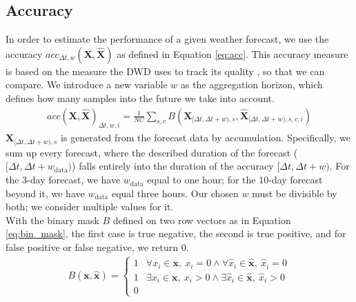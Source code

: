 \documentclass{article}
\theoremstyle{plain}
\theoremstyle{definition}
\theoremstyle{remark}
\begin{document}

\subsection{Accuracy}

In order to estimate the performance of a given weather forecast, we use the
accuracy $acc_{\Delta t, w}(\mathbf{X}, \hat{\mathbf{X}})$ as defined in
Equation \ref{eq:acc}.
This accuracy measure is based on the measure the DWD uses to track its quality
\cite{Forecast_quaility_DWD}, so that we can compare.
We introduce a new variable $w$ as the aggregation horizon, which defines how
many samples into the future we take into account.
\begin{align}
    acc(\mathbf{X}, \hat{\mathbf{X}})_{\Delta t, w, i} = \frac{1}{NC} \sum_{s,
        c} B(\mathbf{X}_{[\Delta t, \Delta t + w), s}, \hat{\mathbf{X}}_{[\Delta t,
    \Delta t + w), s, c, i})
    \label{eq:acc}
\end{align}
$\mathbf{X}_{[\Delta t, \Delta t + w), s}$ is generated from the forecast data
by accumulation.
Specifically, we sum up every forecast, where the described duration of the
forecast ($[\Delta t, \Delta t + w_\text{data})$) falls entirely into the
duration of the accuracy $[\Delta t, \Delta t + w)$.
For the 3-day forecast, we have $w_\text{data}$ equal to one hour; for the
10-day forecast beyond it, we have $w_\text{data}$ equal three hours.
Our chosen $w$ must be divisible by both; we consider multiple values for it.
\\
With the binary mask $B$ defined on two row vectors as in Equation
\ref{eq:bin_mask},
the first case is true negative, the second is true positive, and for false
positive or false negative, we return $0$.
\begin{align}
    B(\mathbf{x}, \hat{\mathbf{x}}) = \begin{cases} 1 & \forall x_i \in
              \mathbf{x}, \ x_i = 0 \land \forall \hat{x}_i \in \hat{\mathbf{x}}, \ \hat{x}_i
              = 0                                                                   \\
              1 & \exists x_i \in \mathbf{x}, \ x_i > 0 \land \exists \hat{x}_i \in
              \hat{\mathbf{x}}, \ \hat{x}_i > 0                                     \\ 0\end{cases}
    \label{eq:bin_mask}
\end{align}
\end{document}
